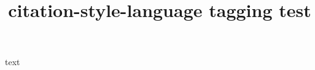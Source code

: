 \documentclass{article}
\title{citation-style-language tagging test}
\begin{document}
text
\end{document}
